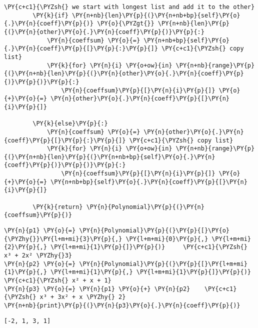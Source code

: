 \begin{example}
\begin{tcolorbox}[breakable, size=fbox, boxrule=1pt, pad at break*=1mm,colback=cellbackground, colframe=cellborder]
\begin{Verbatim}[commandchars=\\\{\}]
        \PY{c+c1}{\PYZsh{} we start with longest list and add it to the other}
        \PY{k}{if} \PY{n+nb}{len}\PY{p}{(}\PY{n+nb+bp}{self}\PY{o}{.}\PY{n}{coeff}\PY{p}{)} \PY{o}{\PYZgt{}} \PY{n+nb}{len}\PY{p}{(}\PY{n}{other}\PY{o}{.}\PY{n}{coeff}\PY{p}{)}\PY{p}{:}
            \PY{n}{coeffsum} \PY{o}{=} \PY{n+nb+bp}{self}\PY{o}{.}\PY{n}{coeff}\PY{p}{[}\PY{p}{:}\PY{p}{]} \PY{c+c1}{\PYZsh{} copy list}
            \PY{k}{for} \PY{n}{i} \PY{o+ow}{in} \PY{n+nb}{range}\PY{p}{(}\PY{n+nb}{len}\PY{p}{(}\PY{n}{other}\PY{o}{.}\PY{n}{coeff}\PY{p}{)}\PY{p}{)}\PY{p}{:}
                \PY{n}{coeffsum}\PY{p}{[}\PY{n}{i}\PY{p}{]} \PY{o}{+}\PY{o}{=} \PY{n}{other}\PY{o}{.}\PY{n}{coeff}\PY{p}{[}\PY{n}{i}\PY{p}{]}

        \PY{k}{else}\PY{p}{:} 
            \PY{n}{coeffsum} \PY{o}{=} \PY{n}{other}\PY{o}{.}\PY{n}{coeff}\PY{p}{[}\PY{p}{:}\PY{p}{]} \PY{c+c1}{\PYZsh{} copy list}
            \PY{k}{for} \PY{n}{i} \PY{o+ow}{in} \PY{n+nb}{range}\PY{p}{(}\PY{n+nb}{len}\PY{p}{(}\PY{n+nb+bp}{self}\PY{o}{.}\PY{n}{coeff}\PY{p}{)}\PY{p}{)}\PY{p}{:}
                \PY{n}{coeffsum}\PY{p}{[}\PY{n}{i}\PY{p}{]} \PY{o}{+}\PY{o}{=} \PY{n+nb+bp}{self}\PY{o}{.}\PY{n}{coeff}\PY{p}{[}\PY{n}{i}\PY{p}{]}
            
        \PY{k}{return} \PY{n}{Polynomial}\PY{p}{(}\PY{n}{coeffsum}\PY{p}{)}
\end{Verbatim}
\end{tcolorbox}

\begin{tcolorbox}[breakable, size=fbox, boxrule=1pt, pad at break*=1mm,colback=cellbackground, colframe=cellborder]
\begin{Verbatim}[commandchars=\\\{\}]
\PY{n}{p1} \PY{o}{=} \PY{n}{Polynomial}\PY{p}{(}\PY{p}{[}\PY{o}{\PYZhy{}}\PY{l+m+mi}{3}\PY{p}{,} \PY{l+m+mi}{0}\PY{p}{,} \PY{l+m+mi}{2}\PY{p}{,} \PY{l+m+mi}{1}\PY{p}{]}\PY{p}{)}     \PY{c+c1}{\PYZsh{} x³ + 2x² \PYZhy{}3}
\PY{n}{p2} \PY{o}{=} \PY{n}{Polynomial}\PY{p}{(}\PY{p}{[}\PY{l+m+mi}{1}\PY{p}{,} \PY{l+m+mi}{1}\PY{p}{,} \PY{l+m+mi}{1}\PY{p}{]}\PY{p}{)}        \PY{c+c1}{\PYZsh{} x² + x + 1}
\PY{n}{p3} \PY{o}{=} \PY{n}{p1} \PY{o}{+} \PY{n}{p2}    \PY{c+c1}{\PYZsh{} x³ + 3x² + x \PYZhy{} 2}
\PY{n+nb}{print}\PY{p}{(}\PY{n}{p3}\PY{o}{.}\PY{n}{coeff}\PY{p}{)}
\end{Verbatim}
\end{tcolorbox}

\begin{Verbatim}[commandchars=\\\{\}]
[-2, 1, 3, 1]
\end{Verbatim}


\end{example}
